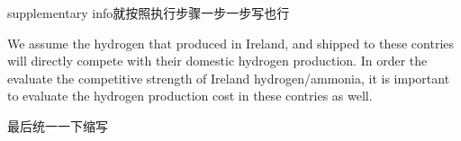 supplementary info就按照执行步骤一步一步写也行


We assume the hydrogen that produced in Ireland, and shipped to these contries will directly compete with their domestic hydrogen production. In order the evaluate the competitive strength of Ireland hydrogen/ammonia, it is important to evaluate the hydrogen production cost in these contries as well. 

最后统一一下缩写